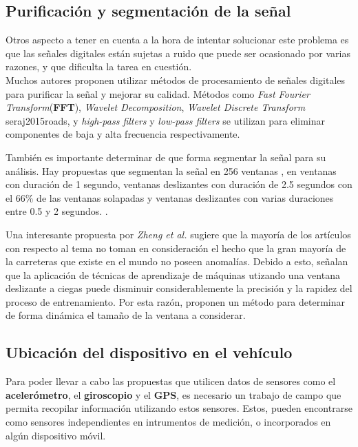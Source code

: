	\subsection{Purificación y segmentación de la señal}
		Otros aspecto a tener en cuenta a la hora de intentar solucionar este problema es que las señales digitales están sujetas a ruido que puede ser
		ocasionado por varias razones, y que dificulta la tarea en cuestión.\\
		\indent Muchos autores proponen utilizar métodos de procesamiento de señales digitales para purificar la señal y mejorar su calidad. Métodos como \emph
		{Fast Fourier Transform}(\textbf{FFT}), \emph{Wavelet Decomposition}, \emph{Wavelet Discrete Transform}\brackcite
		{seraj2015roads}, y \emph{high-pass filters} y \emph{low-pass filters} se utilizan para eliminar
		componentes de baja y alta frecuencia respectivamente.
			
			También es importante determinar de que forma segmentar la señal para su análisis. Hay propuestas que segmentan la señal en 256 ventanas
		, en ventanas con duración de 1 segundo, ventanas deslizantes con duración de 2.5 
		segundos con el 66\% de las ventanas solapadas y ventanas deslizantes con varias duraciones entre 0.5 y 2 segundos.
		.

			Una interesante propuesta por \emph{Zheng et al.} sugiere que la mayoría de los artículos con respecto al tema no
		toman en consideración el hecho que la gran mayoría de la carreteras que existe en el mundo no poseen anomalías. Debido a esto, señalan que la aplicación
		de técnicas de aprendizaje de máquinas utizando una ventana deslizante a ciegas puede disminuir considerablemente la precisión y la rapidez del proceso de
		entrenamiento. Por esta razón, proponen un método para determinar de forma dinámica el tamaño de la ventana a considerar.\\
		
	\subsection{Ubicación del dispositivo en el vehículo}
		Para poder llevar a cabo las propuestas que utilicen datos de sensores como el \textbf{acelerómetro}, 
		el \textbf{giroscopio} y el \textbf{GPS}, es necesario un trabajo de campo que permita recopilar información utilizando estos 
		sensores. Estos, pueden encontrarse como sensores independientes en intrumentos de medición, o incorporados en algún dispositivo móvil.

